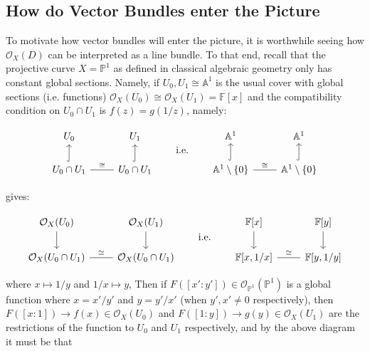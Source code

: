 \documentclass{ut-thesis}
\newcommand{\A}{{\mathbb{A}}}
\newcommand{\F}{{\mathbb{F}}}
\renewcommand{\P}{{\mathbb{P}}}
\newcommand{\CO}{{\mathcal{O}}}
\begin{document}
\subsection{How do Vector Bundles enter the Picture}\label{sec:whyVecBundles}

To motivate how vector bundles will enter the picture, it is worthwhile seeing how $\CO_X(D)$ can be
interpreted as a line bundle. To that end, recall that the projective curve $X = \P^1$ as defined in classical
algebraic geometry only has constant global sections. Namely, if $U_0, U_1\cong \A^1$ is the usual cover with
global sections (i.e. functions) $\CO_X(U_0) \cong \CO_X(U_1) = \F[x]$ and the compatibility condition on
$U_0\cap U_1$ is $f(z) = g(1/z)$, namely:
\begin{center}
  \[
\begin{tikzcd}
U_0                                               &               U_1 \\
     U_0\cap U_1 \arrow[r, "\cong", no head] \arrow[u, hook] & U_0\cap U_1 \arrow[u, hook]
\end{tikzcd}
\qquad \text{i.e.} \qquad
\begin{tikzcd}
\A^1                                       &              \A^1 \\
     \A^1\setminus\{0\} \arrow[u, hook] \arrow[r, "\cong", no head] & \A^1\setminus\{0\} \arrow[u, hook]
\end{tikzcd}
\]
\end{center}
gives:
\begin{center}
  \[
\begin{tikzcd}
\CO_X(U_0) \arrow[d]                                &              \CO_X(U_1) \arrow[d] \\
                    \CO_X(U_0\cap U_1) \arrow[r, "\cong", no head] & \CO_X(U_0\cap U_1)
\end{tikzcd}
\qquad \text{i.e.} \qquad
\begin{tikzcd}
{\F[x]} \arrow[d]                        & {\F[y]} \arrow[d] \\
{\F[x, 1/x]} \arrow[r, "\cong", no head] & {\F[y, 1/y]}
\end{tikzcd}
\]
\end{center}
where $x \mapsto 1/y$ and $1/x \mapsto y$, Then if $F([x':y']) \in
\CO_{\P^1}(\P^1)$ is a global function where $x = x'/y'$ and $y =y'/x'$ (when $y',x'\ne 0$ respectively), then $F([x:1]) \to f(x) \in \CO_X(U_0)$ and $F([1:y]) \to g(y) \in \CO_X(U_1)$
are the restrictions of the function to $U_0$ and $U_1$ respectively, and by the above diagram it must be that
\end{document}
